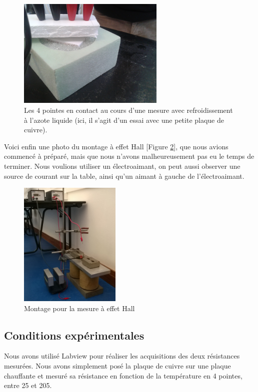 \begin{figure}
  \begin{center}
		\includegraphics[width=7cm]{./images/photo5.jpg}
		\caption{Les 4 pointes en contact au cours d'une mesure avec refroidissement à l'azote liquide (ici, il s'agit d'un essai avec une petite plaque de cuivre).}
		\label{photo5}
	\end{center}
\end{figure}

Voici enfin une photo du montage à effet Hall [Figure \ref{photo_hall}], que nous avions commencé à préparé, 
mais que nous n'avons malheureusement pas eu le temps de terminer. Nous voulions utiliser un électroaimant, 
on peut aussi observer une source de courant sur la table, ainsi qu'un aimant à gauche de l'électroaimant.

\begin{figure}[!t]
  \begin{center}
		\includegraphics[height=6cm]{./images/photo_hall.jpg}
		\caption{Montage pour la mesure à effet Hall}
		\label{photo_hall}
	\end{center}
\end{figure}

\newpage

\subsection{Conditions expérimentales}
Nous avons utilisé Labview pour réaliser les acquisitions des deux résistances mesurées.
Nous avons simplement posé la plaque de cuivre sur une plaque chauffante et mesuré sa résistance en fonction de la température en 4 pointes, entre 25\celsius{} et 205\celsius{}.


